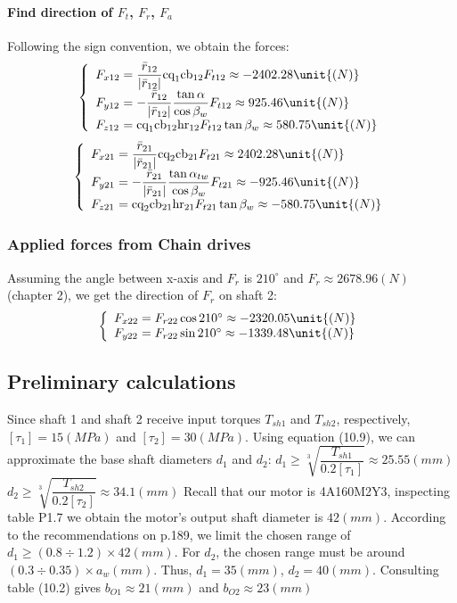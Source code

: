 \paragraph{Find direction of $ F_{t} $, $ F_r $, $ F_a $}
Following the sign convention, we obtain the forces:
\[
\left\{
\begin{array}{l@{{}={}}l}
F_{x12}& \dfrac{\bar{r}_{12}}{|\bar{r}_{12}|}\text{cq}_1\text{cb}_{12}F_{t12}\approx -2402.28 \unit{(N)}\\
F_{y12}& -\dfrac{\bar{r}_{12}}{|\bar{r}_{12}|}\dfrac{\tan\alpha}{\cos\beta_w}F_{t12}\approx 925.46 \unit{(N)}\\
F_{z12}& \text{cq}_1\text{cb}_{12}\text{hr}_{12}F_{t12}\tan\beta_w\approx 580.75 \unit{(N)}\\ 
\end{array}
\right.
\]
\[
\left\{ 
\begin{array}{l@{{}={}}l}
F_{x21}& \dfrac{\bar{r}_{21}}{|\bar{r}_{21}|}\text{cq}_2\text{cb}_{21}F_{t21}\approx 2402.28 \unit{(N)}\\
F_{y21}& -\dfrac{\bar{r}_{21}}{|\bar{r}_{21}|}\dfrac{\tan\alpha_{tw}}{\cos\beta_w}F_{t21}\approx -925.46 \unit{(N)}\\
F_{z21}& \text{cq}_2\text{cb}_{21}\text{hr}_{21}F_{t21}\tan\beta_w\approx -580.75 \unit{(N)}\\ 
\end{array}
\right.
\]

\subsubsection{Applied forces from Chain drives}
Assuming the angle between x-axis and $ F_r $ is $ 210^\circ $ and $ F_r \approx 2678.96 \unit{(N)} $ (chapter 2), we get the direction of $ F_r $ on shaft 2:
\[
\left\{ 
\begin{array}{l@{{}={}}l}
F_{x22}& F_{r22}\cos210^\circ\approx -2320.05 \unit{(N)}\\
F_{y22}& F_{r22}\sin210^\circ\approx -1339.48 \unit{(N)}\\
\end{array}
\right.
\]

\subsection{Preliminary calculations}
Since shaft 1 and shaft 2 receive input torques $ T_{sh1} $ and $ T_{sh2} $, respectively, $ [\tau_1] = 15\unit{(MPa)}$ and $ [\tau_2]=30\unit{(MPa)} $. Using equation (10.9), we can approximate the base shaft diameters $ d_1 $ and $ d_2 $:\vskip2mm
$ d_1 \geq \sqrt[3]{\dfrac{T_{sh1}}{0.2[\tau_1]}} \approx 25.55 \unit{(mm)}$\\
$ d_2 \geq \sqrt[3]{\dfrac{T_{sh2}}{0.2[\tau_2]}} \approx 34.1 \unit{(mm)}$\vskip2mm
Recall that our motor is 4A160M2Y3, inspecting table P1.7 we obtain the motor's output shaft diameter is $ 42 \unit{(mm)} $. According to the recommendations on p.189, we limit the chosen range of $ d_1 \geq (0.8\div1.2)\times 42\unit{(mm)} $. For $ d_2 $, the chosen range must be around $ (0.3\div0.35)\times a_w\unit{(mm)}$. Thus, $ d_1 = 35\unit{(mm)} $, $ d_2 = 40\unit{(mm)} $. Consulting table (10.2) gives $ b_{O1} \approx 21\unit{(mm)} $ and $ b_{O2} \approx 23\unit{(mm)} $

